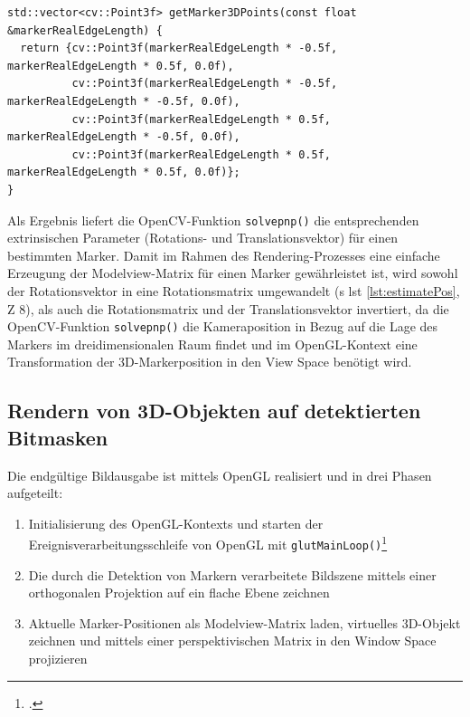 \begin{lstlisting}[caption={Die Funktion \texttt{detectormarkerbased.cpp/getMarker3DPoints()} bestimmt die Position eines Markers im dreidimensionalen Raum}, label={lst:getMarker3DPoints}]
std::vector<cv::Point3f> getMarker3DPoints(const float &markerRealEdgeLength) {
  return {cv::Point3f(markerRealEdgeLength * -0.5f, markerRealEdgeLength * 0.5f, 0.0f),
          cv::Point3f(markerRealEdgeLength * -0.5f, markerRealEdgeLength * -0.5f, 0.0f),
          cv::Point3f(markerRealEdgeLength * 0.5f, markerRealEdgeLength * -0.5f, 0.0f),
          cv::Point3f(markerRealEdgeLength * 0.5f, markerRealEdgeLength * 0.5f, 0.0f)};
}
\end{lstlisting}

\noindent Als Ergebnis liefert die OpenCV-Funktion \texttt{solvepnp()} die entsprechenden extrinsischen Parameter (Rotations- und Translationsvektor) für einen bestimmten Marker. Damit im Rahmen des Rendering-Prozesses eine einfache Erzeugung der Modelview-Matrix für einen Marker gewährleistet ist, wird sowohl der Rotationsvektor in eine Rotationsmatrix umgewandelt (\acs{s} \acs{lst} \ref{lst:estimatePos}, \acs{Z} 8), als auch die Rotationsmatrix und der Translationsvektor invertiert, da die OpenCV-Funktion \texttt{solvepnp()} die Kameraposition in Bezug auf die Lage des Markers im dreidimensionalen Raum findet und im OpenGL-Kontext eine Transformation der 3D-Markerposition in den View Space benötigt wird.

\subsection{Rendern von 3D-Objekten auf detektierten Bitmasken}
Die endgültige Bildausgabe ist mittels OpenGL realisiert und in drei Phasen aufgeteilt:

\begin{enumerate}
\item Initialisierung des OpenGL-Kontexts und starten der Ereignisverarbeitungsschleife von OpenGL mit \texttt{glutMainLoop()}\footcite{openglglutMainLoop}
\item Die durch die Detektion von Markern verarbeitete Bildszene mittels einer orthogonalen Projektion auf ein flache Ebene zeichnen
\item Aktuelle Marker-Positionen als Modelview-Matrix laden, virtuelles 3D-Objekt zeichnen und mittels einer perspektivischen Matrix in den Window Space projizieren
\end{enumerate}

